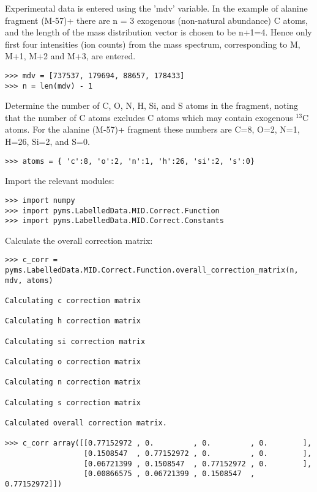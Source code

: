 Experimental data is entered using the 'mdv' variable. In the example of
alanine fragment (M-57)+ \cite{nanchen07} there are n = 3 exogenous (non-natural
abundance) C atoms, and the length of the mass distribution vector
is chosen to be n+1=4. Hence only first four intensities (ion counts)
from the mass spectrum, corresponding to M, M+1, M+2 and M+3, are entered.

\begin{verbatim}
>>> mdv = [737537, 179694, 88657, 178433]
>>> n = len(mdv) - 1
\end{verbatim}

Determine the number of C, O, N, H, Si, and S atoms in the fragment,
noting that the number of C atoms excludes C atoms which may contain
exogenous $^{13}$C atoms. For the alanine (M-57)+ fragment these
numbers are C=8, O=2, N=1, H=26, Si=2, and S=0.

\begin{verbatim} 
>>> atoms = { 'c':8, 'o':2, 'n':1, 'h':26, 'si':2, 's':0}
\end{verbatim}

Import the relevant modules:

\begin{verbatim}
>>> import numpy
>>> import pyms.LabelledData.MID.Correct.Function
>>> import pyms.LabelledData.MID.Correct.Constants
\end{verbatim}

Calculate the overall correction matrix:

\begin{verbatim}
>>> c_corr = pyms.LabelledData.MID.Correct.Function.overall_correction_matrix(n, mdv, atoms)

Calculating c correction matrix

Calculating h correction matrix

Calculating si correction matrix

Calculating o correction matrix

Calculating n correction matrix

Calculating s correction matrix

Calculated overall correction matrix.

>>> c_corr array([[0.77152972 , 0.         , 0.         , 0.        ],
                  [0.1508547  , 0.77152972 , 0.         , 0.        ],
                  [0.06721399 , 0.1508547  , 0.77152972 , 0.        ],
                  [0.00866575 , 0.06721399 , 0.1508547  , 0.77152972]])
\end{verbatim}

